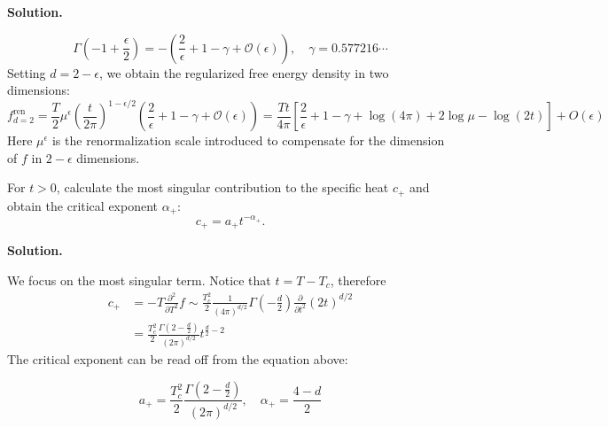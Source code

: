 \documentclass[11pt,a4paper]{article}
\newcounter{problem}
\newcounter{saveequation}
\newenvironment{solution}
{
	\par
	\setcounter{saveequation}{\value{equation}}
	\begingroup
	\setcounter{equation}{0}
	\renewcommand{\theequation}{\arabic{problem}.\arabic{equation}}
	\renewcommand{\theHequation}{sol.\arabic{problem}.\arabic{equation}}
	\noindent\textbf{Solution.}\quad
}
{
	\par
	\endgroup
	\setcounter{equation}{\value{saveequation}}
}
\begin{document}
\begin{solution}
\begin{equation}
		\Gamma\left(-1+\frac\epsilon2\right)=-\left(\frac2\epsilon+1-\gamma+\mathcal{O}(\epsilon)\right),\quad \gamma =0.577216\cdots
	\end{equation}
	Setting $d=2-\epsilon$, we obtain the regularized free energy density in two dimensions:
	\begin{equation}
		f^\text{ren}_{d=2}=\frac T2\mu^\epsilon\left(\frac{t}{2\pi}\right)^{1-\epsilon/2}\left(\frac2\epsilon+1-\gamma+\mathcal{O}(\epsilon)\right)=
		\frac{Tt}{4\pi}
		\left[
		\frac{2}{\epsilon}
		+1-\gamma
		+\log(4\pi)
		+2\log\mu
		-\log(2t)
		\right]
		+O(\epsilon)
	\end{equation}
	Here $\mu^\epsilon$ is the renormalization scale introduced to compensate for the dimension of $f$ in $2-\epsilon$ dimensions.
	\end{solution}
	\begin{problembox}
		For $t > 0$, calculate the most singular contribution to the specific heat $c_+$ and obtain the critical exponent $\alpha_+$:
		\begin{equation}
			c_+ = a_+ t^{-\alpha_+}.
		\end{equation}
	\end{problembox}
	\begin{solution}
		We focus on the most singular term. Notice that $t=T-T_c$, therefore
		\begin{equation}
			\label{eq:6.1}
			\begin{aligned}
				c_+&=-T\frac{\partial^2}{\partial T^2}f\sim \frac{T_c^2}{2}\frac{1}{(4\pi)^{d/2}}\Gamma\left(-\frac d2\right) \frac{\partial}{\partial t^2} (2t)^{d/2}\\
				&=\frac{T_c^2}{2}\frac{\Gamma{\left(2-\frac d2\right)}}{(2\pi)^{d/2}}t^{\frac d2-2}
			\end{aligned}
		\end{equation}
		The critical exponent can be read off from the equation above:
		\begin{finalanswer}
			\begin{equation}
				\label{fin:6}
				a_+=\frac{T_c^2}{2}\frac{\Gamma{\left(2-\frac d2\right)}}{(2\pi)^{d/2}},\quad \alpha_+=\frac{4-d}{2}
			\end{equation}
		\end{finalanswer}
	\end{solution}
	
\end{document}
